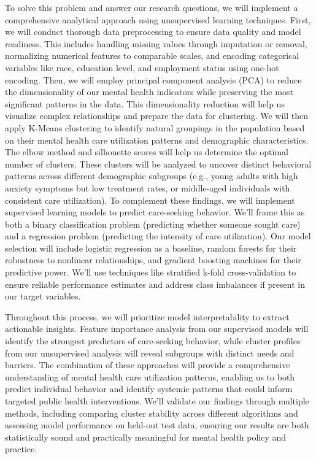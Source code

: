 \documentclass{article}
\begin{document}
To solve this problem and answer our research questions, we will implement a comprehensive analytical approach using unsupervised learning techniques. First, we will conduct thorough data preprocessing to ensure data quality and model readiness. This includes handling missing values through imputation or removal, normalizing numerical features to comparable scales, and encoding categorical variables like race, education level, and employment status using one-hot encoding. Then, we will employ principal component analysis (PCA) to reduce the dimensionality of our mental health indicators while preserving the most significant patterns in the data. This dimensionality reduction will help us visualize complex relationships and prepare the data for clustering. We will then apply K-Means clustering to identify natural groupings in the population based on their mental health care utilization patterns and demographic characteristics. The elbow method and silhouette scores will help us determine the optimal number of clusters. These clusters will be analyzed to uncover distinct behavioral patterns across different demographic subgroups (e.g., young adults with high anxiety symptoms but low treatment rates, or middle-aged individuals with consistent care utilization). To complement these findings, we will implement supervised learning models to predict care-seeking behavior. We'll frame this as both a binary classification problem (predicting whether someone sought care) and a regression problem (predicting the intensity of care utilization). Our model selection will include logistic regression as a baseline, random forests for their robustness to nonlinear relationships, and gradient boosting machines for their predictive power. We'll use techniques like stratified k-fold cross-validation to ensure reliable performance estimates and address class imbalances if present in our target variables.

\vspace{0.5cm}

Throughout this process, we will prioritize model interpretability to extract actionable insights. Feature importance analysis from our supervised models will identify the strongest predictors of care-seeking behavior, while cluster profiles from our unsupervised analysis will reveal subgroups with distinct needs and barriers. The combination of these approaches will provide a comprehensive understanding of mental health care utilization patterns, enabling us to both predict individual behavior and identify systemic patterns that could inform targeted public health interventions. We'll validate our findings through multiple methods, including comparing cluster stability across different algorithms and assessing model performance on held-out test data, ensuring our results are both statistically sound and practically meaningful for mental health policy and practice.
\end{document}
